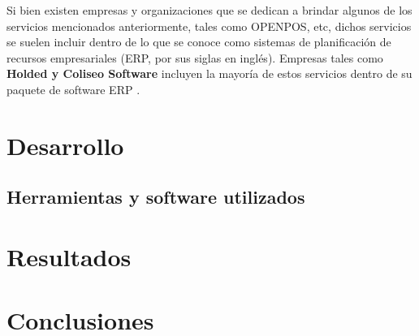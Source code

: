 \documentclass[10pt, a4paper]{article}
\begin{document}
Si bien existen empresas y organizaciones que se dedican a brindar algunos de los servicios mencionados anteriormente, tales como OPENPOS, etc, dichos servicios se suelen incluir dentro de lo que se conoce como sistemas de planificación de recursos empresariales (ERP, por sus siglas en inglés).
Empresas tales como \textbf{Holded y Coliseo Software} incluyen la mayoría de estos servicios dentro de su paquete de software ERP \cite{wiki:erp}.
\section{Desarrollo}
\subsection*{Herramientas y software utilizados}
\section{Resultados}
\section{Conclusiones}

\end{document}
